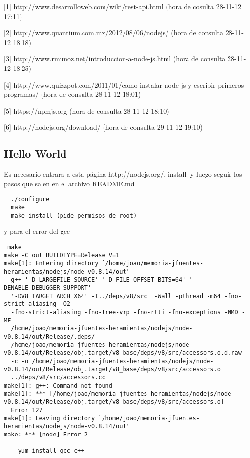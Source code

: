 

[1] http://www.desarrolloweb.com/wiki/rest-api.html (hora de cosulta 28-11-12 17:11)

[2] http://www.quantium.com.mx/2012/08/06/nodejs/ (hora de consulta 28-11-12 18:18)

[3] http://www.rmunoz.net/introduccion-a-node-js.html (hora de consulta 28-11-12 18:25)

[4] http://www.quizzpot.com/2011/01/como-instalar-node-js-y-escribir-primeros-programas/ (hora de consulta 28-11-12 18:01)

[5] https://npmjs.org (hora de consulta 28-11-12 18:10)

[6] http://nodejs.org/download/ (hora de consulta 29-11-12 19:10) 


\subsection{Hello World}

Es necesario entrara a esta página http://nodejs.org/, install, y luego seguir los pasos
que salen en el archivo README.md
\begin{verbatim}
  ./configure
  make
  make install (pide permisos de root)
\end{verbatim}

y para el error del gcc 
\begin{verbatim}
 make
make -C out BUILDTYPE=Release V=1
make[1]: Entering directory `/home/joao/memoria-jfuentes-heramientas/nodejs/node-v0.8.14/out'
  g++ '-D_LARGEFILE_SOURCE' '-D_FILE_OFFSET_BITS=64' '-DENABLE_DEBUGGER_SUPPORT' 
  '-DV8_TARGET_ARCH_X64' -I../deps/v8/src  -Wall -pthread -m64 -fno-strict-aliasing -O2 
  -fno-strict-aliasing -fno-tree-vrp -fno-rtti -fno-exceptions -MMD -MF 
  /home/joao/memoria-jfuentes-heramientas/nodejs/node-v0.8.14/out/Release/.deps/
  /home/joao/memoria-jfuentes-heramientas/nodejs/node-v0.8.14/out/Release/obj.target/v8_base/deps/v8/src/accessors.o.d.raw  
  -c -o /home/joao/memoria-jfuentes-heramientas/nodejs/node-v0.8.14/out/Release/obj.target/v8_base/deps/v8/src/accessors.o 
  ../deps/v8/src/accessors.cc
make[1]: g++: Command not found
make[1]: *** [/home/joao/memoria-jfuentes-heramientas/nodejs/node-v0.8.14/out/Release/obj.target/v8_base/deps/v8/src/accessors.o] 
  Error 127
make[1]: Leaving directory `/home/joao/memoria-jfuentes-heramientas/nodejs/node-v0.8.14/out'
make: *** [node] Error 2

	yum install gcc-c++
\end{verbatim}

